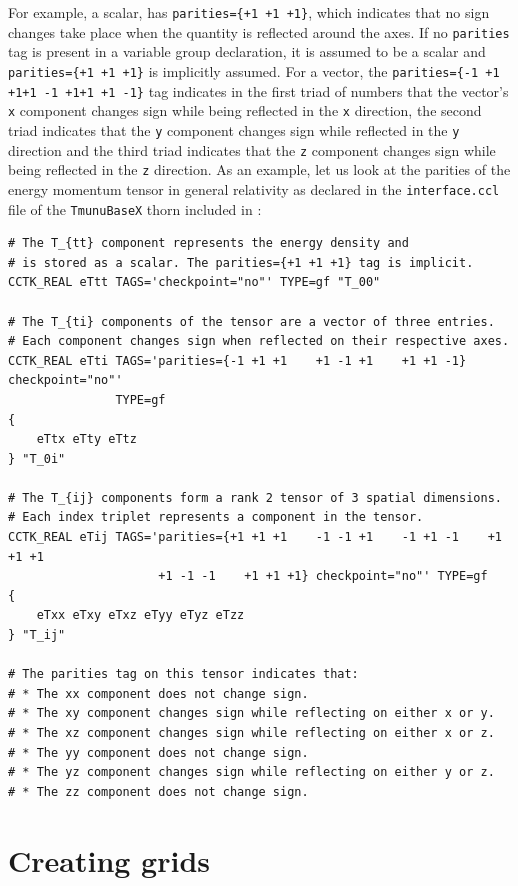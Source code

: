 For example, a scalar, has \texttt{parities=\{+1 +1 +1\}}, which indicates that no sign changes take place when the quantity is reflected around the axes. If no \texttt{parities} tag is present in a variable group declaration, it is assumed to be a scalar and \texttt{parities=\{+1 +1 +1\}} is implicitly assumed. For a vector, the \texttt{parities=\{-1 +1 +1\hspace{15pt}+1 -1 +1\hspace{15pt}+1 +1 -1\}} tag indicates in the first triad of numbers that the vector's \texttt{x} component changes sign while being reflected in the \texttt{x} direction, the second triad indicates that the \texttt{y} component changes sign while reflected in the \texttt{y} direction and the third triad indicates that the \texttt{z} component changes sign while being reflected in the \texttt{z} direction. As an example, let us look at the parities of the energy momentum tensor in general relativity as declared in the \texttt{interface.ccl} file of the \texttt{TmunuBaseX} thorn included in \CarpetX\space: 
%
\begin{verbatim}
# The T_{tt} component represents the energy density and
# is stored as a scalar. The parities={+1 +1 +1} tag is implicit.
CCTK_REAL eTtt TAGS='checkpoint="no"' TYPE=gf "T_00"

# The T_{ti} components of the tensor are a vector of three entries.
# Each component changes sign when reflected on their respective axes.
CCTK_REAL eTti TAGS='parities={-1 +1 +1    +1 -1 +1    +1 +1 -1} checkpoint="no"'
               TYPE=gf
{ 
    eTtx eTty eTtz
} "T_0i"

# The T_{ij} components form a rank 2 tensor of 3 spatial dimensions.
# Each index triplet represents a component in the tensor.
CCTK_REAL eTij TAGS='parities={+1 +1 +1    -1 -1 +1    -1 +1 -1    +1 +1 +1
                     +1 -1 -1    +1 +1 +1} checkpoint="no"' TYPE=gf
{
    eTxx eTxy eTxz eTyy eTyz eTzz
} "T_ij"

# The parities tag on this tensor indicates that:
# * The xx component does not change sign.
# * The xy component changes sign while reflecting on either x or y.
# * The xz component changes sign while reflecting on either x or z.
# * The yy component does not change sign.
# * The yz component changes sign while reflecting on either y or z.
# * The zz component does not change sign.
\end{verbatim}

\section{Creating grids}
\label{sec:grids}

